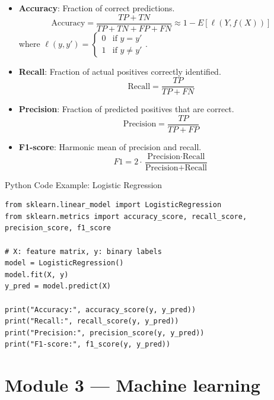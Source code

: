 \documentclass{beamer}
\begin{document}
\begin{frame}
\begin{itemize}
    \item \textbf{Accuracy}: Fraction of correct predictions.
    \[
    \text{Accuracy} = \frac{TP + TN}{TP + TN + FP + FN}
     \approx 1-E[\ell(Y,f(X))]
    \]
    where $\ell(y,y')=
    \begin{cases}
    0 & \text{if } y = y' \\
    1 & \text{if } y \neq y'
    \end{cases}$.

    \item \textbf{Recall}: Fraction of actual positives correctly identified.
    \[
    \text{Recall} = \frac{TP}{TP + FN}
    \]
    \item \textbf{Precision}: Fraction of predicted positives that are correct.
    \[
    \text{Precision} = \frac{TP}{TP + FP}
    \]
    \item \textbf{F1-score}: Harmonic mean of precision and recall.
    \[
    F1 = 2 \cdot \frac{\text{Precision} \cdot \text{Recall}}{\text{Precision} + \text{Recall}}
    \]
\end{itemize}
\end{frame}
\begin{frame}[fragile]{Python Code Example: Logistic Regression}
\begin{verbatim}
from sklearn.linear_model import LogisticRegression
from sklearn.metrics import accuracy_score, recall_score, precision_score, f1_score

# X: feature matrix, y: binary labels
model = LogisticRegression()
model.fit(X, y)
y_pred = model.predict(X)

print("Accuracy:", accuracy_score(y, y_pred))
print("Recall:", recall_score(y, y_pred))
print("Precision:", precision_score(y, y_pred))
print("F1-score:", f1_score(y, y_pred))
\end{verbatim}

\end{frame}
\section{Module 3 — Machine learning}
\end{document}
